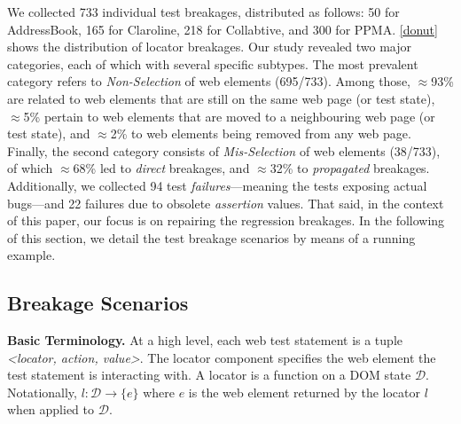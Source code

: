 \label{sec:study}
We collected 733 individual test breakages, distributed as follows: 50 for AddressBook, 165 for Claroline, 218 for Collabtive, and 300 for PPMA.
\autoref{donut} shows the distribution of locator breakages. Our study revealed two major categories, each of which with several specific subtypes. The most prevalent category refers to \textit{Non-Selection} of web elements (695/733). Among those, $\approx$93\% are related to web elements that are still on the same web page (or test state), $\approx$5\% pertain to web elements that are moved to a neighbouring web page (or test state), and $\approx$2\% to web elements being removed from any web page.
Finally, the second category consists of \textit{Mis-Selection} of web elements (38/733), of which $\approx$68\% led to \textit{direct} breakages, and $\approx$32\% to \textit{propagated} breakages. 
Additionally, we collected 94 test \textit{failures}---meaning the tests exposing actual bugs---and 22 failures due to obsolete \textit{assertion} values.
%
That said, in the context of this paper, our focus is on repairing the regression breakages. In the following of this section, we detail the test breakage scenarios by means of a running example. 



\subsection{Breakage Scenarios}\label{sec:breakage-scenarios}

\noindent
\textbf{Basic Terminology.}
At a high level, each web test statement is a tuple \textit{<locator, action, value>}. 
The locator component specifies the web element the test statement is interacting with. A locator is a function on a DOM state $\mathcal{D}$. Notationally, $l: \mathcal{D} \rightarrow \{e\}$ where $e$ is the web element returned by the locator $l$ when applied to $\mathcal{D}$. 
%




